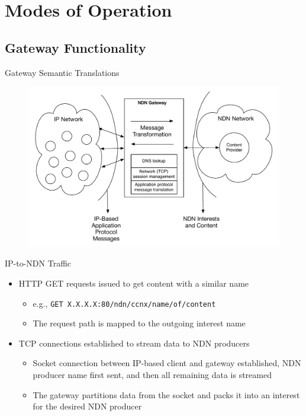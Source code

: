 \documentclass[handout]{beamer}
\begin{document}
\section{Modes of Operation}
\subsection{Gateway Functionality}
\begin{frame}{Gateway Semantic Translations}
	\begin{figure}[h]
		\includegraphics[scale=0.4]{img/gateway_highlevel.pdf}
	\end{figure}
\end{frame}

\begin{frame}{IP-to-NDN Traffic}
	\begin{itemize}
		\item HTTP GET requests issued to get content with a similar name
		\begin{itemize}
			\item e.g., {\tt GET X.X.X.X:80/ndn/ccnx/name/of/content}
			\item The request path is mapped to the outgoing interest name 
		\end{itemize}
		\item TCP connections established to stream data to NDN producers
		\begin{itemize}
			\item Socket connection between IP-based client and gateway established, NDN producer name first sent, and then all remaining data is streamed
			\item The gateway partitions data from the socket and packs it into an interest for the desired NDN producer
		\end{itemize}
	\end{itemize}
\end{frame}
\end{document}
